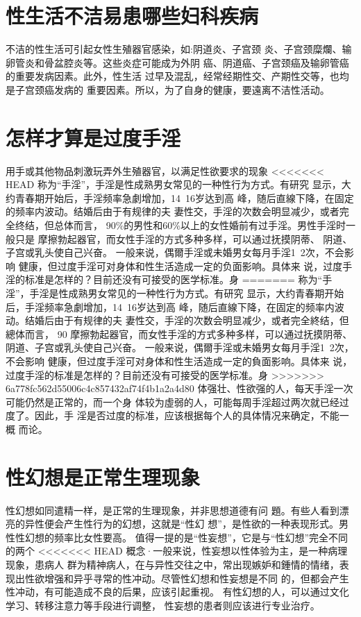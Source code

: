 \documentclass[12pt,UTF8]{ctexbook}
\begin{document}
\section{性生活不洁易患哪些妇科疾病}

不洁的性生活可引起女性生殖器官感染，如:阴道炎、子宫颈
炎、子宫颈糜爛、输卵管炎和骨盆腔炎等。这些炎症可能成为外阴
癌、阴道癌、子宫颈癌及输卵管癌的重要发病因素。此外，性生活
过早及混乱，经常经期性交、产期性交等，也均是子宫颈癌发病的
重要因素。所以，为了自身的健康，要遠离不洁性活动。

\section{怎样才算是过度手淫}

用手或其他物品刺激玩弄外生殖器官，以满足性欲要求的现象
<<<<<<< HEAD
称为“手淫”，手淫是性成熟男女常见的一种性行为方式。有研究
显示，大约青春期开始后，手淫频率急劇增加，14~16岁达到高
峰，随后直線下降，在固定的频率内波动。结婚后由于有规律的夫
妻性交，手淫的次数会明显减少，或者完全终结，但总体而言，
90\%的男性和60\%以上的女性婚前有过手淫。男性手淫时一般只是
摩擦勃起器官，而女性手淫的方式多种多样，可以通过抚摸阴蒂、
阴道、子宫或乳头使自己兴奋。
一般来说，偶爾手淫或未婚男女每月手淫1~2次，不会影响
健康，但过度手淫可对身体和性生活造成一定的负面影响。具体来
说，过度手淫的标准是怎样的？目前还没有可接受的医学标准。身
=======
称为“手淫”，手淫是性成熟男女常见的一种性行为方式。有研究
显示，大约青春期开始后，手淫频率急劇增加，14~16岁达到高
峰，随后直線下降，在固定的频率内波动。结婚后由于有规律的夫
妻性交，手淫的次数会明显减少，或者完全終结，但總体而言，
90%
摩擦勃起器官，而女性手淫的方式多种多样，可以通过抚摸阴蒂、
阴道、子宫或乳头使自己兴奋。
一般来说，偶爾手淫或未婚男女每月手淫1~2次，不会影响
健康，但过度手淫可对身体和性生活造成一定的負面影响。具体来
说，过度手淫的标准是怎样的？目前还没有可接受的医学标准。身
>>>>>>> 6a778fc562d55006c4c857432af74f4b1a2a4d80
体强壮、性欲强的人，每天手淫一次可能仍然是正常的，而一个身
体较为虛弱的人，可能每周手淫超过两次就已经过度了。因此，手
淫是否过度的标准，应该根据每个人的具体情况来确定，不能一概
而论。
\section{性幻想是正常生理现象}
性幻想如同遣精一样，是正常的生理现象，并非思想道德有问
題。有些人看到漂亮的异性便会产生性行为的幻想，这就是“性幻
想”，是性欲的一种表现形式。男性性幻想的频率比女性要高。
值得一提的是“性妄想”，它是与“性幻想”完全不同的两个
<<<<<<< HEAD
概念·一般来说，性妄想以性体验为主，是一种病理现象，患病人
群为精神病人，在与异性交往之中，常出现嫉妒和鍾情的情绪，表
现出性欲增强和异乎寻常的性冲动。尽管性幻想和性妄想是不同
的，但都会产生性冲动，有可能造成不良的后果，应该引起重视。
有性幻想的人，可以通过文化学习、转移注意力等手段进行调整，
性妄想的患者则应该进行专业治疗。
\end{document}
